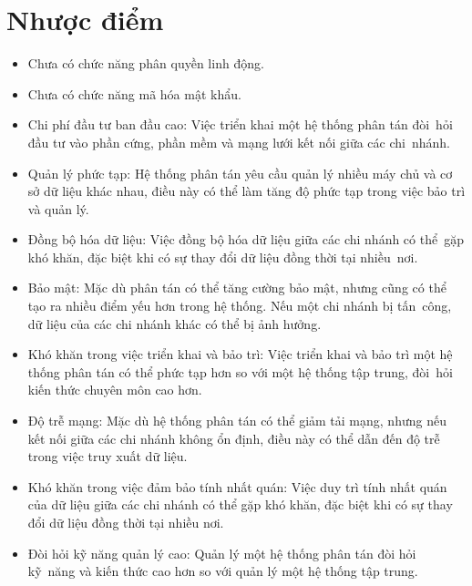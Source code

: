 \documentclass[a4paper,12pt]{report}
\begin{document}
\section{Nhược điểm}
\begin{itemize}
    \item Chưa có chức năng phân quyền linh động.
    \item Chưa có chức năng mã hóa mật khẩu.
    \item Chi phí đầu tư ban đầu cao: Việc triển khai một hệ thống phân tán đòi~hỏi đầu tư vào phần cứng, phần mềm và mạng lưới kết nối giữa các chi~nhánh.
    \item Quản lý phức tạp: Hệ thống phân tán yêu cầu quản lý nhiều máy chủ và cơ sở dữ liệu khác nhau, điều này có thể làm tăng độ phức tạp trong việc bảo trì và quản lý.
    \item Đồng bộ hóa dữ liệu: Việc đồng bộ hóa dữ liệu giữa các chi nhánh có thể~gặp khó khăn, đặc biệt khi có sự thay đổi dữ liệu đồng thời tại nhiều~nơi.
    \item Bảo mật: Mặc dù phân tán có thể tăng cường bảo mật, nhưng cũng có thể tạo ra nhiều điểm yếu hơn trong hệ thống. Nếu một chi nhánh bị tấn~công, dữ liệu của các chi nhánh khác có thể bị ảnh hưởng.
    \item Khó khăn trong việc triển khai và bảo trì: Việc triển khai và bảo trì một hệ thống phân tán có thể phức tạp hơn so với một hệ thống tập trung, đòi~hỏi kiến thức chuyên môn cao hơn.
    \item Độ trễ mạng: Mặc dù hệ thống phân tán có thể giảm tải mạng, nhưng nếu kết nối giữa các chi nhánh không ổn định, điều này có thể dẫn đến độ trễ trong việc truy xuất dữ liệu.
    \item Khó khăn trong việc đảm bảo tính nhất quán: Việc duy trì tính nhất quán của dữ liệu giữa các chi nhánh có thể gặp khó khăn, đặc biệt khi có sự thay đổi dữ liệu đồng thời tại nhiều nơi.
    \item Đòi hỏi kỹ năng quản lý cao: Quản lý một hệ thống phân tán đòi hỏi kỹ~năng và kiến thức cao hơn so với quản lý một hệ thống tập trung.
\end{itemize}
\end{document}
